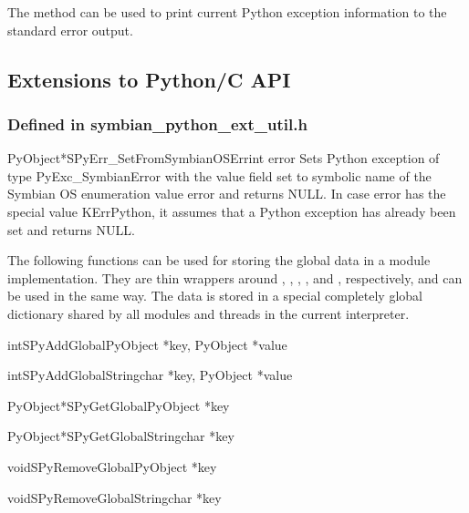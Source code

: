 The  method can be used to print current 
Python exception information to the standard error output.

\subsection{Extensions to Python/C API}

\subsubsection{Defined in symbian_python_ext_util.h}

\begin{cfuncdesc}{PyObject*}{SPyErr_SetFromSymbianOSErr}{int error}
Sets Python exception of type \textsf{PyExc_SymbianError} with the value 
field set to symbolic name of the Symbian OS enumeration value 
\textsf{error} and returns \textsf{NULL}. In case \textsf{error} has the 
special value \textsf{KErrPython}, it assumes that a Python exception has 
already been set and returns \textsf{NULL}.
\end{cfuncdesc}

The following functions can be used for storing the global data in a module 
implementation. They are thin wrappers around 
,  
, , 
,  and 
, respectively, and can be used in the same way. 
The data is stored in a special completely global dictionary shared by all modules and threads in the current interpreter.

\begin{cfuncdesc}{int}{SPyAddGlobal}{PyObject *key, PyObject *value}\end{cfuncdesc}
\begin{cfuncdesc}{int}{SPyAddGlobalString}{char *key, PyObject *value}\end{cfuncdesc}
\begin{cfuncdesc}{PyObject*}{SPyGetGlobal}{PyObject *key}\end{cfuncdesc}
\begin{cfuncdesc}{PyObject*}{SPyGetGlobalString}{char *key}\end{cfuncdesc}
\begin{cfuncdesc}{void}{SPyRemoveGlobal}{PyObject *key}\end{cfuncdesc}
\begin{cfuncdesc}{void}{SPyRemoveGlobalString}{char *key}\end{cfuncdesc}

